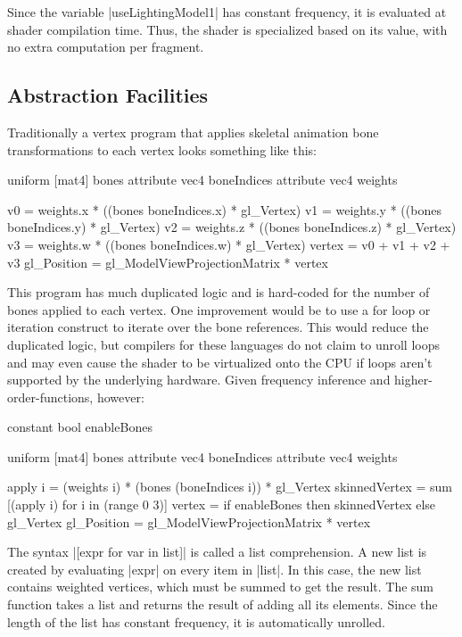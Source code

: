 \documentclass{acmsiggraph}               %
\begin{document}
Since the variable |useLightingModel1| has constant frequency, it is
evaluated at shader compilation time.  Thus, the shader is specialized
based on its value, with no extra computation per fragment.


\subsection{Abstraction Facilities}

Traditionally a vertex program that applies skeletal animation bone
transformations to each vertex looks something like this:

\begin{MyVerb}
uniform [mat4] bones
attribute vec4 boneIndices
attribute vec4 weights

v0 = weights.x * ((bones boneIndices.x) * gl_Vertex)
v1 = weights.y * ((bones boneIndices.y) * gl_Vertex)
v2 = weights.z * ((bones boneIndices.z) * gl_Vertex)
v3 = weights.w * ((bones boneIndices.w) * gl_Vertex)
vertex = v0 + v1 + v2 + v3
gl_Position = gl_ModelViewProjectionMatrix * vertex
\end{MyVerb}

This program has much duplicated logic and is hard-coded for the
number of bones applied to each vertex.  One improvement would be to
use a for loop or iteration construct to iterate over the bone
references.  This would reduce the duplicated logic, but compilers for
these languages do not claim to unroll loops and may even cause the
shader to be virtualized onto the CPU if loops aren't supported by the
underlying hardware.  Given frequency inference and
higher-order-functions, however:

\begin{MyVerb}
constant bool enableBones

uniform [mat4] bones
attribute vec4 boneIndices
attribute vec4 weights

apply i = (weights i) * (bones (boneIndices i))
          * gl_Vertex
skinnedVertex = 
    sum [(apply i) for i in (range 0 3)]
vertex = if enableBones then skinnedVertex else gl_Vertex
gl_Position = gl_ModelViewProjectionMatrix * vertex
\end{MyVerb}


The syntax |[expr for var in list]| is called a list comprehension.  A
new list is created by evaluating |expr| on every item in |list|.  In
this case, the new list contains weighted vertices, which must be
summed to get the result.  The sum function takes a list and returns
the result of adding all its elements.  Since the length of the list
has constant frequency, it is automatically unrolled.
\end{document}

